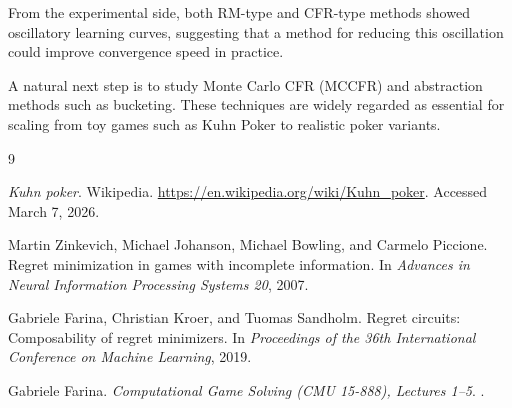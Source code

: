 \documentclass[11pt]{article}
\begin{document}
From the experimental side, both RM-type and CFR-type methods showed oscillatory learning curves, suggesting that a method for reducing this oscillation could improve convergence speed in practice.

A natural next step is to study Monte Carlo CFR (MCCFR) and abstraction methods such as bucketing. These techniques are widely regarded as essential for scaling from toy games such as Kuhn Poker to realistic poker variants.

\begin{thebibliography}{9}

\emph{Kuhn poker}.
\newblock Wikipedia.
\newblock \url{https://en.wikipedia.org/wiki/Kuhn_poker}.
\newblock Accessed March 7, 2026.

Martin Zinkevich, Michael Johanson, Michael Bowling, and Carmelo Piccione.
\newblock Regret minimization in games with incomplete information.
\newblock In \emph{Advances in Neural Information Processing Systems 20}, 2007.

Gabriele Farina, Christian Kroer, and Tuomas Sandholm.
\newblock Regret circuits: Composability of regret minimizers.
\newblock In \emph{Proceedings of the 36th International Conference on Machine Learning}, 2019.

Gabriele Farina.
\newblock \emph{Computational Game Solving (CMU 15-888), Lectures 1--5}.
.

\end{thebibliography}
\end{document}
